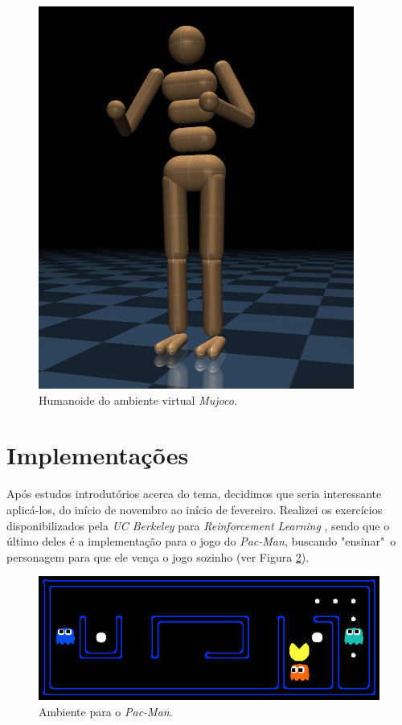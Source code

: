 \documentclass{article}
\begin{document}
        \begin{figure}[h!]
            \centering
            \includegraphics[scale=0.8]{humanoid.png}
            \caption{Humanoide do ambiente virtual \textit{Mujoco}.}
            \label{fig:humanoid}
        \end{figure}

    \section{Implementações}

        Após estudos introdutórios acerca do tema, decidimos
        que seria interessante aplicá-los, do início de novembro ao início de fevereiro.
        Realizei os exercícios
        disponibilizados pela \textit{UC Berkeley} para \textit{Reinforcement
        Learning}
        , sendo que o último deles é a implementação para o jogo
        do \textit{Pac-Man}, buscando "ensinar"\ o personagem para que
        ele vença o jogo sozinho (ver Figura \ref{fig:pac-man}).

        \begin{figure}[h!]
            \centering
            \includegraphics[width=\textwidth]{pac_man.png}
            \caption{Ambiente para o \textit{Pac-Man}.}
            \label{fig:pac-man}
        \end{figure}
\end{document}
